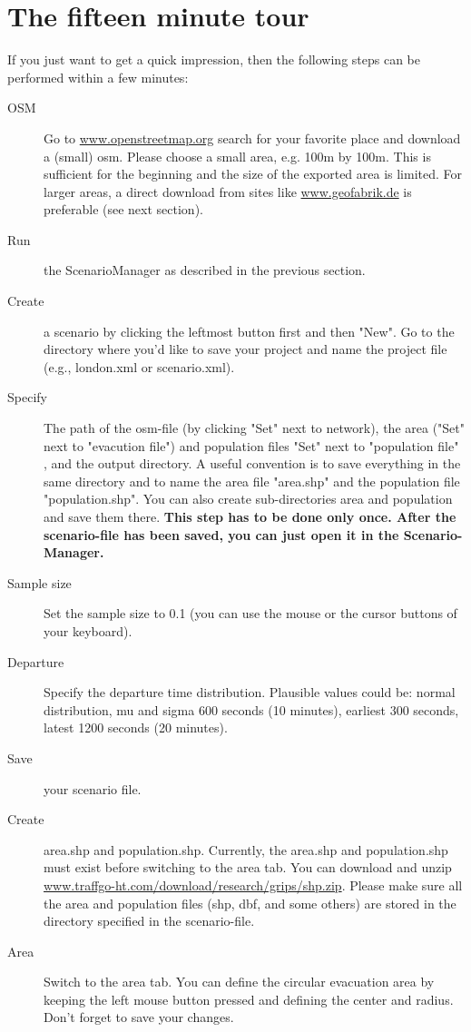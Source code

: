 \section{The fifteen minute tour}
If you just want to get a quick impression, then the following steps can be performed within a few minutes:
\begin{description}
\item[OSM] Go to \url{www.openstreetmap.org} search for your favorite place and download a (small) osm. Please choose a small area, e.g. 100m by 100m. This is sufficient for the beginning and the size of the exported area is limited. For larger areas, a direct download from sites like \url{www.geofabrik.de} is preferable (see next section).
\item[Run] the ScenarioManager as described in the previous section.
\item[Create] a scenario by clicking the leftmost button first and then "New". Go to the directory where you'd like to save your project and name the project file (e.g., london.xml or scenario.xml).
\item[Specify] The path of the osm-file (by clicking "Set" next to network), the area ("Set" next to "evacution file") and population files "Set" next to "population file" , and the output directory.
A useful convention is to save everything in the same directory and to name the area file "area.shp" and the population file "population.shp". You can also create sub-directories area and population and save them there.
\textbf{This step has to be done only once. After the scenario-file has been saved, you can just open it in the Scenario-Manager.}
\item[Sample size] Set the sample size to 0.1 (you can use the mouse or the cursor buttons of your keyboard).
\item[Departure] Specify the departure time distribution. Plausible values could be: normal distribution, mu and sigma 600 seconds (10 minutes), earliest 300 seconds, latest 1200 seconds (20 minutes).
\item[Save] your scenario file.
\item[Create] area.shp and population.shp. Currently, the area.shp and population.shp must exist before switching to the area tab. You can download and unzip \url{www.traffgo-ht.com/download/research/grips/shp.zip}. Please make sure all the area and population files (shp, dbf, and some others) are stored in the directory specified in the scenario-file.
\item[Area] Switch to the area tab. You can define the circular evacuation area by keeping the left mouse button pressed and defining the center and radius. Don't forget to save your changes.

\end{description}
